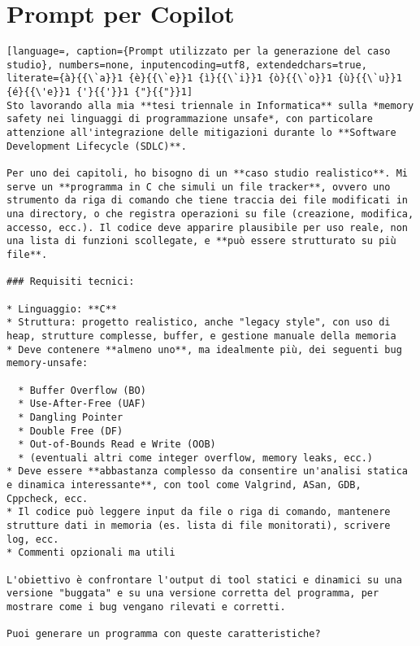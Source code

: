 \chapter{Prompt per Copilot}
\label{appendix:prompt}

\begin{lstlisting}[language=, caption={Prompt utilizzato per la generazione del caso studio}, numbers=none, inputencoding=utf8, extendedchars=true, literate={à}{{\`a}}1 {è}{{\`e}}1 {ì}{{\`i}}1 {ò}{{\`o}}1 {ù}{{\`u}}1 {é}{{\'e}}1 {'}{{'}}1 {"}{{"}}1]
Sto lavorando alla mia **tesi triennale in Informatica** sulla *memory safety nei linguaggi di programmazione unsafe*, con particolare attenzione all'integrazione delle mitigazioni durante lo **Software Development Lifecycle (SDLC)**.

Per uno dei capitoli, ho bisogno di un **caso studio realistico**. Mi serve un **programma in C che simuli un file tracker**, ovvero uno strumento da riga di comando che tiene traccia dei file modificati in una directory, o che registra operazioni su file (creazione, modifica, accesso, ecc.). Il codice deve apparire plausibile per uso reale, non una lista di funzioni scollegate, e **può essere strutturato su più file**.

### Requisiti tecnici:

* Linguaggio: **C**
* Struttura: progetto realistico, anche "legacy style", con uso di heap, strutture complesse, buffer, e gestione manuale della memoria
* Deve contenere **almeno uno**, ma idealmente più, dei seguenti bug memory-unsafe:

  * Buffer Overflow (BO)
  * Use-After-Free (UAF)
  * Dangling Pointer
  * Double Free (DF)
  * Out-of-Bounds Read e Write (OOB)
  * (eventuali altri come integer overflow, memory leaks, ecc.)
* Deve essere **abbastanza complesso da consentire un'analisi statica e dinamica interessante**, con tool come Valgrind, ASan, GDB, Cppcheck, ecc.
* Il codice può leggere input da file o riga di comando, mantenere strutture dati in memoria (es. lista di file monitorati), scrivere log, ecc.
* Commenti opzionali ma utili

L'obiettivo è confrontare l'output di tool statici e dinamici su una versione "buggata" e su una versione corretta del programma, per mostrare come i bug vengano rilevati e corretti.

Puoi generare un programma con queste caratteristiche?
\end{lstlisting}